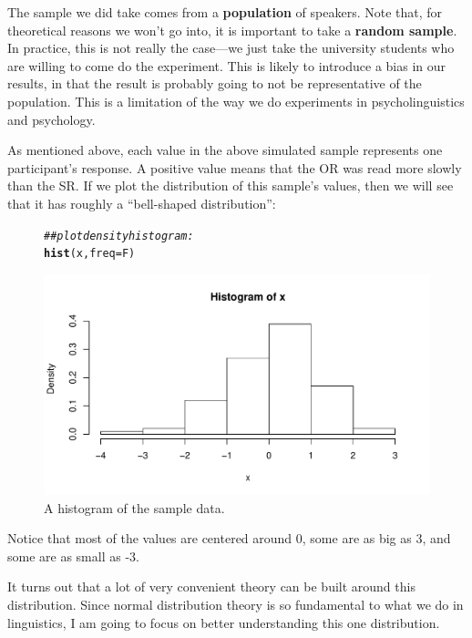\documentclass[12pt]{book}\usepackage[]{graphicx}\usepackage[]{color}
\makeatletter
\def\maxwidth{ %
  \ifdim\Gin@nat@width>\linewidth
    \linewidth
  \else
    \Gin@nat@width
  \fi
}
\newcommand{\hlcom}[1]{\textcolor[rgb]{0.678,0.584,0.686}{\textit{#1}}}%
\newcommand{\hlstd}[1]{\textcolor[rgb]{0.345,0.345,0.345}{#1}}%
\newcommand{\hlkwc}[1]{\textcolor[rgb]{0.333,0.667,0.333}{#1}}%
\newcommand{\hlkwd}[1]{\textcolor[rgb]{0.737,0.353,0.396}{\textbf{#1}}}%
\newenvironment{kframe}{%
 \def\at@end@of@kframe{}%
 \ifinner\ifhmode%
  \def\at@end@of@kframe{\end{minipage}}%
  \begin{minipage}{\columnwidth}%
 \fi\fi%
 \def\FrameCommand##1{\hskip\@totalleftmargin \hskip-\fboxsep
 \colorbox{shadecolor}{##1}\hskip-\fboxsep
     \hskip-\linewidth \hskip-\@totalleftmargin \hskip\columnwidth}%
 \MakeFramed {\advance\hsize-\width
   \@totalleftmargin\z@ \linewidth\hsize
   \@setminipage}}%
 {\par\unskip\endMakeFramed%
 \at@end@of@kframe}
\newenvironment{knitrout}{}{} %
\makeatother
\begin{document}
The sample we did take comes from a \textbf{population} of speakers. Note that, for theoretical reasons we won't go into, it is important to take a \textbf{random sample}. In practice, this is not really the case---we just take the university students who are willing to come do the experiment. This is likely to introduce a bias in our results, in that the result is probably going to not be representative of the population. This is a limitation of the way we do experiments in psycholinguistics and psychology.

As mentioned above, each value in the above simulated sample represents one participant's response. A positive value means that the OR was read more slowly than the SR. If we plot the distribution of this sample's values, then we will see that it has roughly a ``bell-shaped distribution'':

\begin{figure}
\begin{knitrout}
\color{fgcolor}\begin{kframe}
\begin{alltt}
\hlcom{## plot density histogram:}
\hlkwd{hist}\hlstd{(x,}\hlkwc{freq}\hlstd{=F)}
\end{alltt}
\end{kframe}
\includegraphics[width=\maxwidth]{figure/unnamed-chunk-4-1} 

\end{knitrout}
\caption{A histogram of the sample data.}\label{hist1}
\end{figure}
Notice that most of the values are centered around 0, some are as big as 3, and some are as small as -3. 

It turns out that a lot of very convenient theory can be built around this distribution. Since normal distribution theory is so fundamental to what we do in linguistics, I am going to focus on better understanding this one distribution.
\end{document}
